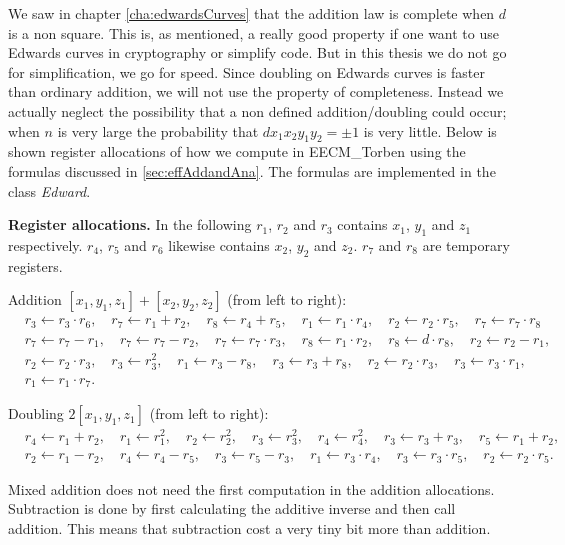 We saw in chapter \ref{cha:edwardsCurves} that the addition law is complete when $d$ is a non square. This is, as mentioned, a really good property if one want to use Edwards curves in cryptography or simplify code. But in this thesis we do not go for simplification, we go for speed. Since doubling on Edwards curves is faster than ordinary addition, we will not use the property of completeness. Instead we actually neglect the possibility that a non defined addition/doubling could occur; when $n$ is very large the probability that $dx_1x_2y_1y_2=\pm 1$ is very little. Below is shown register allocations of how we compute in EECM\_Torben using the formulas discussed in \ref{sec:effAddandAna}. The formulas are implemented in the class \textit{Edward}.

\textbf{Register allocations.} In the following $r_1$, $r_2$ and $r_3$ contains $x_1$, $y_1$ and $z_1$ respectively. $r_4$, $r_5$ and $r_6$ likewise contains $x_2$, $y_2$ and $z_2$. $r_7$ and $r_8$ are temporary registers.  

Addition $[x_1,y_1,z_1]+[x_2,y_2,z_2]$ (from left to right):
\begin{align*}
&r_3\leftarrow r_3\cdot r_6,\quad r_7\leftarrow r_1+r_2,\quad r_8\leftarrow r_4+r_5,\quad r_1 \leftarrow r_1\cdot r_4,\quad r_2\leftarrow r_2\cdot r_5,\quad r_7 \leftarrow r_7\cdot r_8 \\
&r_7 \leftarrow r_7-r_1, \quad r_7 \leftarrow r_7-r_2, \quad r_7 \leftarrow r_7\cdot r_3,\quad r_8 \leftarrow r_1\cdot r_2,\quad r_8\leftarrow d\cdot r_8,\quad r_2\leftarrow r_2-r_1,\\
&r_2 \leftarrow r_2\cdot r_3,\quad r_3\leftarrow r_3^2,\quad r_1\leftarrow r_3-r_8,\quad r_3\leftarrow r_3+r_8,\quad r_2\leftarrow r_2\cdot r_3,\quad r_3\leftarrow r_3\cdot r_1, \\
&r_1\leftarrow r_1\cdot r_7.
\end{align*}

Doubling $2[x_1,y_1,z_1]$ (from left to right):
\begin{align*}
&r_4\leftarrow r_1+r_2,\quad r_1\leftarrow r_1^2,\quad r_2\leftarrow r_2^2,\quad r_3\leftarrow r_3^2,\quad r_4\leftarrow r_4^2,\quad r_3\leftarrow r_3+r_3,\quad r_5\leftarrow r_1+r_2, \\
&r_2\leftarrow r_1-r_2,\quad r_4\leftarrow r_4-r_5,\quad r_3\leftarrow r_5-r_3,\quad r_1\leftarrow r_3\cdot r_4, \quad r_3\leftarrow r_3\cdot r_5,\quad r_2\leftarrow r_2\cdot r_5.
\end{align*}

Mixed addition does not need the first computation in the addition allocations. Subtraction is done by first calculating the additive inverse and then call addition. This means that subtraction cost a very tiny bit more than addition.

